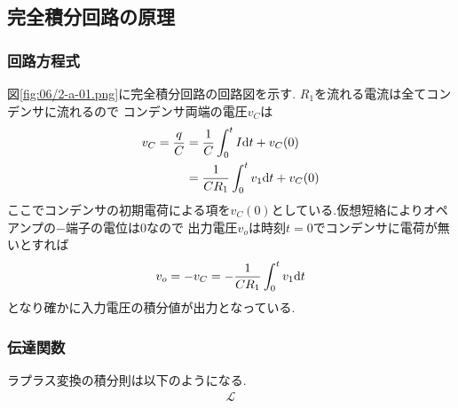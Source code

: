 \subsection{完全積分回路の原理}
\subsubsection{回路方程式}
図\ref{fig:06/2-a-01.png}に完全積分回路の回路図を示す.
$R_1$を流れる電流は全てコンデンサに流れるので
コンデンサ両端の電圧$v_C$は
\begin{align}
  \begin{split}
    v_C=\frac{q}{C}&=\frac{1}{C}\int^t_0I{\rm d}t+v_C(0)\\
    &=\frac{1}{CR_1}\int^t_0v_1{\rm d}t+v_C(0)
  \end{split}
\end{align}
ここでコンデンサの初期電荷による項を$v_C(0)$としている.仮想短絡によりオペアンプの$-$端子の電位は0なので
出力電圧$v_o$は時刻$t=0$でコンデンサに電荷が無いとすれば
\begin{align}
  v_o=-v_C=-\frac{1}{CR_1}\int^t_0v_1{\rm d}t
\end{align}
となり確かに入力電圧の積分値が出力となっている.
\subsubsection{伝達関数}
ラプラス変換の積分則は以下のようになる.
\begin{align}
  \mathcal{L}
\end{align}